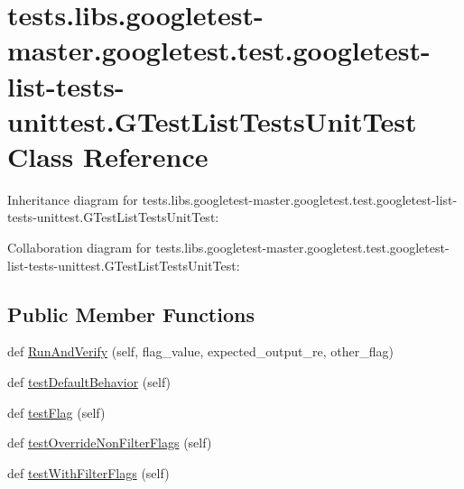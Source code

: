 \hypertarget{classtests_1_1libs_1_1googletest-master_1_1googletest_1_1test_1_1googletest-list-tests-unittest_1_1GTestListTestsUnitTest}{}\section{tests.\+libs.\+googletest-\/master.googletest.\+test.\+googletest-\/list-\/tests-\/unittest.G\+Test\+List\+Tests\+Unit\+Test Class Reference}
\label{classtests_1_1libs_1_1googletest-master_1_1googletest_1_1test_1_1googletest-list-tests-unittest_1_1GTestListTestsUnitTest}


Inheritance diagram for tests.\+libs.\+googletest-\/master.googletest.\+test.\+googletest-\/list-\/tests-\/unittest.G\+Test\+List\+Tests\+Unit\+Test\+:


Collaboration diagram for tests.\+libs.\+googletest-\/master.googletest.\+test.\+googletest-\/list-\/tests-\/unittest.G\+Test\+List\+Tests\+Unit\+Test\+:
\subsection*{Public Member Functions}
\begin{DoxyCompactItemize}
\item 
def \hyperlink{classtests_1_1libs_1_1googletest-master_1_1googletest_1_1test_1_1googletest-list-tests-unittest_1_1GTestListTestsUnitTest_aaae370d40ccfb5aa05540948670a9117}{Run\+And\+Verify} (self, flag\+\_\+value, expected\+\_\+output\+\_\+re, other\+\_\+flag)
\item 
def \hyperlink{classtests_1_1libs_1_1googletest-master_1_1googletest_1_1test_1_1googletest-list-tests-unittest_1_1GTestListTestsUnitTest_a78413b87b88cb614df1968f05b66aa2a}{test\+Default\+Behavior} (self)
\item 
def \hyperlink{classtests_1_1libs_1_1googletest-master_1_1googletest_1_1test_1_1googletest-list-tests-unittest_1_1GTestListTestsUnitTest_a1e842c78e6c584b5324b3e3a95a8e964}{test\+Flag} (self)
\item 
def \hyperlink{classtests_1_1libs_1_1googletest-master_1_1googletest_1_1test_1_1googletest-list-tests-unittest_1_1GTestListTestsUnitTest_a7d5ca071c8a2096bea197a6b388af4ea}{test\+Override\+Non\+Filter\+Flags} (self)
\item 
def \hyperlink{classtests_1_1libs_1_1googletest-master_1_1googletest_1_1test_1_1googletest-list-tests-unittest_1_1GTestListTestsUnitTest_af89d05616eed02e4012ef2a0aae51b7d}{test\+With\+Filter\+Flags} (self)
\end{DoxyCompactItemize}


